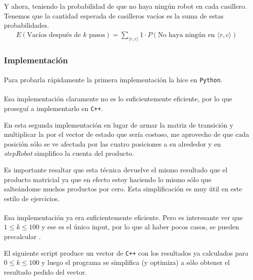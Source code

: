 \documentclass[../main.tex]{subfiles}
\begin{document}
Y ahora, teniendo la probabilidad de que no haya ningún robot en cada casillero. Tenemos que la cantidad esperada de casilleros vacíos es la suma de estas probabilidades.  
\begin{gather*}
  E(\text{Vacíos después de \(k\) pasos}) = \sum_{\langle r, c \rangle}1 \cdot P(\text{No haya ningún en } \langle r, c \rangle)
\end{gather*}

\subsubsection{Implementación}

\paragraph{} Para probarla rápidamente la primera implementación la hice en \texttt{Python}.



\paragraph{} Esa implementación claramente no es lo suficientemente eficiente, por lo que proseguí a implementarlo en \texttt{C++}.

En esta segunda implementación en lugar de armar la matriz de transición y multiplicar la por el vector de estado que sería costoso, me aprovecho de que cada posición sólo se ve afectada por las cuatro posiciones a su alrededor y en \textit{stepRobot} simplifico la cuenta del producto.

Es importante resaltar que esta técnica devuelve el mismo resultado que el producto matricial ya que en efecto estoy haciendo lo mismo sólo que salteándome muchos productos por cero. Esta simplificación es muy útil en este estilo de ejercicios.



\paragraph{} Esa implementación ya era suficientemente eficiente. Pero es interesante ver que \(1 \leq k \leq 100\) y ese es el único input, por lo que al haber pocos casos, se pueden precalcular .

El siguiente script produce un vector de \texttt{C++} con los resultados ya calculados para \(0 \leq k \leq 100\) y luego el programa se simplifica (y optimiza) a sólo obtener el resultado pedido del vector.
\end{document}
